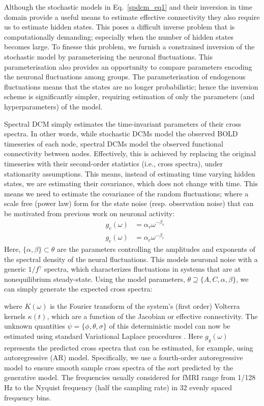 Although the stochastic models in  Eq.~\ref{spdcm_eq1} and their inversion in time domain provide a useful means to estimate effective connectivity they also require us to estimate hidden states. This poses a difficult inverse problem that is computationally demanding; especially when the number of hidden states becomes large. To finesse this problem, we furnish a constrained inversion of the stochastic model by parameterising the neuronal fluctuations. This parameterisation also provides an opportunity to compare parameters encoding the neuronal fluctuations among groups. The parameterisation of endogenous fluctuations means that the states are no longer probabilistic; hence the inversion scheme is significantly simpler, requiring estimation of only the parameters (and hyperparameters) of the model.

Spectral DCM simply estimates the time-invariant parameters of their cross spectra. In other words, while stochastic DCMs model the observed BOLD timeseries of each node, spectral DCMs model the observed functional connectivity between nodes. Effectively, this is achieved by replacing the original timeseries with their second-order statistics (i.e., cross spectra), under stationarity assumptions. This means, instead of estimating time varying hidden states, we are estimating their covariance, which does not change with time. This means we need to estimate the covariance of the random fluctuations; where a scale free (power law) form for the state noise (resp. observation noise) that can be motivated from previous work on neuronal activity:
\begin{eqnarray}\label{spdcm_eq4}
& g_{v}(\omega) & = \alpha_{v}\omega^{-\beta_{v}}\\ \nonumber
& g_{e}(\omega) & = \alpha_{e}\omega^{-\beta_{e}}
\end{eqnarray}
Here, $\{\alpha,\beta\}\subset \theta$ are the parameters controlling the amplitudes and exponents of the spectral density of the neural fluctuations. This models neuronal noise with a generic $1/f^{\gamma}$ spectra, which characterizes fluctuations in systems that are at nonequilibrium steady-state. Using the model parameters, $\theta \supseteq \{A,C,\alpha, \beta\}$, we can simply generate the expected cross spectra:


where $K(\omega)$ is the Fourier transform of the system's (first order) Volterra kernels  $\kappa(t)$, which are a function of the Jacobian or effective connectivity. The unknown quantities $\psi=\{\phi,\theta,\sigma\}$ of this deterministic model can now be estimated using standard Variational Laplace procedures \cite{FristonLaplace2007}. Here $g_{y} (\omega)$ represents the predicted cross spectra that can be estimated, for example, using autoregressive (AR) model. Specifically, we use a fourth-order autoregressive model to ensure smooth sample cross spectra of the sort predicted by the generative model. The frequencies usually considered for fMRI range from 1/128 Hz to the Nyquist frequency (half the sampling rate) in 32 evenly spaced frequency bins.


